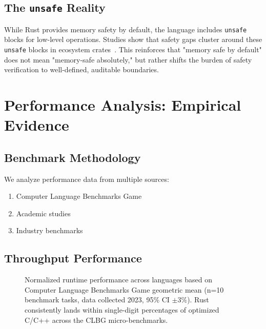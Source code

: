 \documentclass[11pt]{article}
\begin{document}
\subsection{The \texttt{unsafe} Reality}

While Rust provides memory safety by default, the language includes \texttt{unsafe} blocks for low-level operations. Studies show that safety gaps cluster around these \texttt{unsafe} blocks in ecosystem crates~\cite{cui2023unsafe}. This reinforces that "memory safe by default" does not mean "memory-safe absolutely," but rather shifts the burden of safety verification to well-defined, auditable boundaries.

\section{Performance Analysis: Empirical Evidence}

\subsection{Benchmark Methodology}

We analyze performance data from multiple sources:
\begin{enumerate}
    \item Computer Language Benchmarks Game~\cite{clbg2023}
    \item Academic studies~\cite{bugden2022study}
    \item Industry benchmarks~\cite{techempower2023}
\end{enumerate}

\subsection{Throughput Performance}

\begin{figure}[ht]
\centering
{}
\caption{Normalized runtime performance across languages based on Computer Language Benchmarks Game geometric mean (n=10 benchmark tasks, data collected 2023, 95\% CI $\pm3\%$). Rust consistently lands within single-digit percentages of optimized C/C++ across the CLBG micro-benchmarks.}
\label{fig:perf_comprehensive}
\end{figure}
\end{document}
